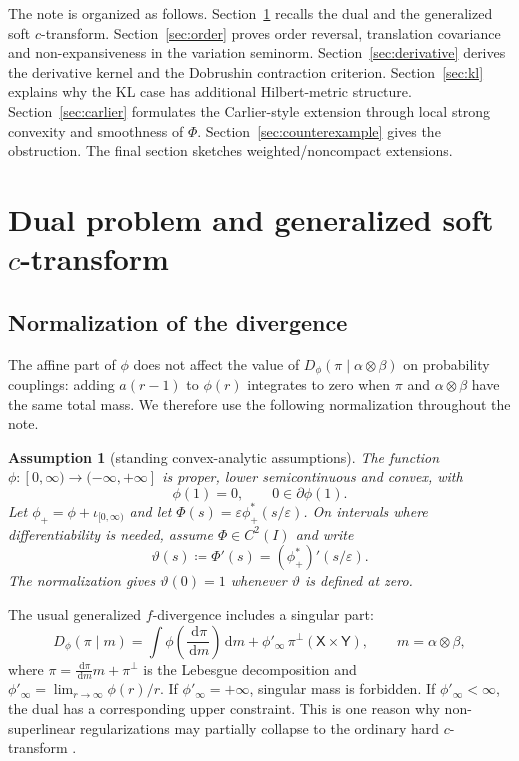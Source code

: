 \documentclass[11pt]{article}
\newtheorem{assumption}[theorem]{Assumption}
\newcommand{\X}{\mathsf{X}}
\newcommand{\Y}{\mathsf{Y}}
\newcommand{\eps}{\varepsilon}
\newcommand{\dd}{\,\mathrm{d}}
\newcommand{\defeq}{\coloneqq}
\begin{document}
The note is organized as follows.  Section~\ref{sec:dual} recalls the dual and
the generalized soft $c$-transform.  Section~\ref{sec:order} proves order
reversal, translation covariance and non-expansiveness in the variation
seminorm.  Section~\ref{sec:derivative} derives the derivative kernel and the
Dobrushin contraction criterion.  Section~\ref{sec:kl} explains why the KL case
has additional Hilbert-metric structure.  Section~\ref{sec:carlier} formulates
the Carlier-style extension through local strong convexity and smoothness of
$\Phi$.  Section~\ref{sec:counterexample} gives the obstruction.  The final
section sketches weighted/noncompact extensions.

\section{Dual problem and generalized soft \texorpdfstring{$c$}{c}-transform}\label{sec:dual}

\subsection{Normalization of the divergence}

The affine part of $\phi$ does not affect the value of
$D_\phi(\pi\mid \alpha\otimes\beta)$ on probability couplings: adding
$a(r-1)$ to $\phi(r)$ integrates to zero when $\pi$ and
$\alpha\otimes\beta$ have the same total mass.  We therefore use the following
normalization throughout the note.

\begin{assumption}[standing convex-analytic assumptions]\label{ass:phi}
The function $\phi:[0,\infty)\to(-\infty,+\infty]$ is proper, lower
semicontinuous and convex, with
\begin{equation*}
  \phi(1)=0,\qquad 0\in\partial \phi(1).
\end{equation*}
Let $\phi_+=\phi+\iota_{[0,\infty)}$ and let
$\Phi(s)=\eps\phi_+^*(s/\eps)$.  On intervals where differentiability is
needed, assume $\Phi\in C^2(I)$ and write
\begin{equation*}
  \vartheta(s)\defeq \Phi'(s)=(\phi_+^*)'(s/\eps).
\end{equation*}
The normalization gives $\vartheta(0)=1$ whenever $\vartheta$ is defined at
zero.
\end{assumption}

The usual generalized $f$-divergence includes a singular part:
\begin{equation*}
  D_\phi(\pi\mid m)
  =\int \phi\!\left(\frac{\dd\pi}{\dd m}\right)\dd m
  +\phi'_\infty\,\pi^\perp(\X\times\Y),
  \qquad m=\alpha\otimes\beta,
\end{equation*}
where $\pi=\frac{\dd\pi}{\dd m}m+\pi^\perp$ is the Lebesgue decomposition and
$\phi'_\infty=\lim_{r\to\infty}\phi(r)/r$.  If $\phi'_\infty=+
\infty$, singular mass is forbidden.  If $\phi'_\infty<\infty$, the dual has a
corresponding upper constraint.  This is one reason why non-superlinear
regularizations may partially collapse to the ordinary hard $c$-transform
\cite{terjek2022}.
\end{document}

